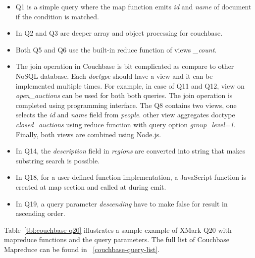 \begin{itemize}
 \item Q1 is a simple query where the map function emits \textit{id} and \textit{name} of document if the condition is matched.
 \item In Q2 and Q3 are deeper array and object processing for couchbase.
 \item Both Q5 and Q6 use the built-in reduce function of views \textit{\_count}.
 \item The join operation in Couchbase is bit complicated as compare to other NoSQL database. Each \textit{doctype} should have a view and it can be implemented multiple times. For example, in case of Q11 and Q12, view on \textit{open\_auctions} can be used for both both queries.  The join operation is completed using programming interface. The Q8 contains two views, one selects the \textit{id} and \textit{name} field from \textit{people}. other view aggregates doctype  \textit{closed\_auctions} using reduce function with query option \textit{group\_level=1}. Finally, both views are combined using Node.js. 
 \item In Q14, the \textit{description} field in \textit{regions} are converted into string  that makes substring search is possible.
 
 \item In Q18, for a user-defined function implementation, a JavaScript function is created at map section and called at during emit. 
 \item In Q19, a query parameter \textit{descending} have to make false for result in ascending order. 
 \end{itemize}
 
 Table~\ref{tbl:couchbase-q20} illustrates a sample example of XMark  Q20 with  mapreduce functions and the query parameters. The full list of Couchbase Mapreduce can be found in ~\ref{couchbase-query-list}.

